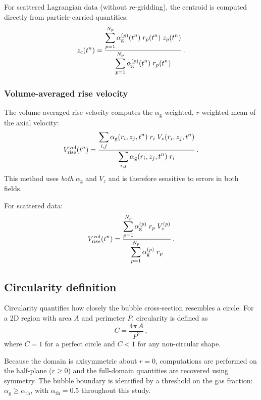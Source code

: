 \documentclass[11pt,a4paper]{article}
\newcommand{\alphag}{\alpha_{\mathrm{g}}}
\newcommand{\Vz}{V_z}
\begin{document}
For scattered Lagrangian data (without re-gridding), the centroid is
computed directly from particle-carried quantities:
\begin{equation}\label{eq:centroid_lag}
  z_c(t^n) = \frac{%
    \displaystyle\sum_{p=1}^{N_p} \alphag^{(p)}(t^n)\; r_p(t^n)\; z_p(t^n)
  }{%
    \displaystyle\sum_{p=1}^{N_p} \alphag^{(p)}(t^n)\; r_p(t^n)
  }\,.
\end{equation}


\subsubsection{Volume-averaged rise velocity}
\label{sec:vol_avg}

The volume-averaged rise velocity computes the $\alphag$-weighted,
$r$-weighted mean of the axial velocity:
\begin{equation}\label{eq:vrise_volavg}
  V_{\mathrm{rise}}^{\mathrm{vol}}(t^n)
  = \frac{%
    \displaystyle\sum_{i,j}
      \alphag(r_i,z_j,t^n)\; r_i\; \Vz(r_i,z_j,t^n)
  }{%
    \displaystyle\sum_{i,j}
      \alphag(r_i,z_j,t^n)\; r_i
  }\,.
\end{equation}
This method uses \emph{both} $\alphag$ and $\Vz$ and is therefore sensitive
to errors in both fields.

For scattered data:
\begin{equation}\label{eq:vrise_volavg_lag}
  V_{\mathrm{rise}}^{\mathrm{vol}}(t^n)
  = \frac{%
    \displaystyle\sum_{p=1}^{N_p}
      \alphag^{(p)}\; r_p\; \Vz^{(p)}
  }{%
    \displaystyle\sum_{p=1}^{N_p}
      \alphag^{(p)}\; r_p
  }\,.
\end{equation}


\subsection{Circularity definition}
\label{sec:circularity}

Circularity quantifies how closely the bubble cross-section resembles a
circle.  For a 2D region with area $A$ and perimeter $P$, circularity is
defined as
\begin{equation}\label{eq:circ_def}
  C = \frac{4\pi\, A}{P^2}\,,
\end{equation}
where $C = 1$ for a perfect circle and $C < 1$ for any non-circular shape.

Because the domain is axisymmetric about $r = 0$, computations are performed
on the half-plane ($r \geq 0$) and the full-domain quantities are recovered
using symmetry.  The bubble boundary is identified by a threshold on the gas
fraction: $\alphag \geq \alpha_{\mathrm{th}}$, with $\alpha_{\mathrm{th}} =
0.5$ throughout this study.
\end{document}
